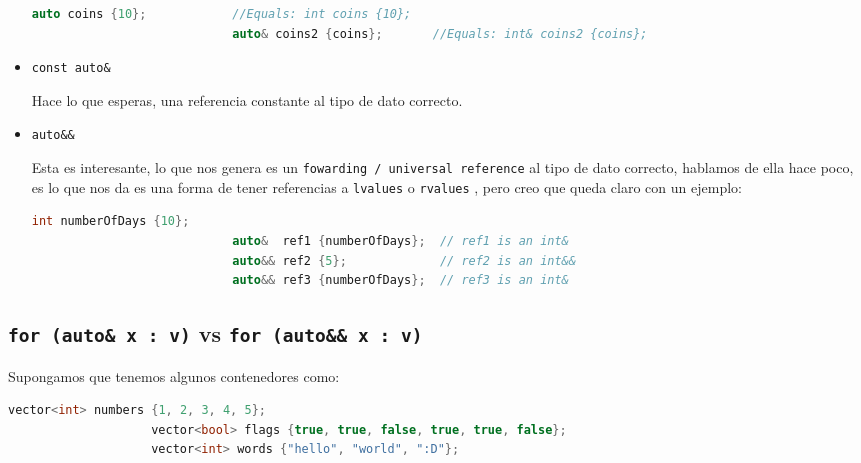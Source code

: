\documentclass[12pt, fleqn]{report}                             %
\theoremstyle{break}                                            %
\newcommand{\textCode}[1]  { \texttt{#1} }                      %
\begin{document}
\begin{itemize}
                        \begin{lstlisting}[language=C++, gobble=28]
                            auto coins {10};            //Equals: int coins {10};
                            auto& coins2 {coins};       //Equals: int& coins2 {coins};
                        \end{lstlisting}

                    \item \textCode{const auto\&}
                    
                        Hace lo que esperas, una referencia constante al tipo de dato correcto.

                    \item \textCode{auto\&\&}
                    
                        Esta es interesante, lo que nos genera es un \textCode{fowarding / universal reference}
                        al tipo de dato correcto, hablamos de ella hace poco, es lo que nos da es una 
                        forma de tener referencias a \textCode{lvalues} o \textCode{rvalues}, pero creo 
                        que queda claro con un ejemplo:
                        \begin{lstlisting}[language=C++, gobble=28]
                            int numberOfDays {10};
                            auto&  ref1 {numberOfDays};  // ref1 is an int&
                            auto&& ref2 {5};             // ref2 is an int&&
                            auto&& ref3 {numberOfDays};  // ref3 is an int&
                        \end{lstlisting}

                \end{itemize}

     
            \clearpage
            \subsection{ \textCode{for (auto\& x : v)} vs \textCode{for (auto\&\& x : v)} } 
            
                Supongamos que tenemos algunos contenedores como:
                \begin{lstlisting}[language=C++, gobble=20]
                    vector<int> numbers {1, 2, 3, 4, 5};
                    vector<bool> flags {true, true, false, true, true, false};
                    vector<int> words {"hello", "world", ":D"};
                \end{lstlisting}
\end{document}
